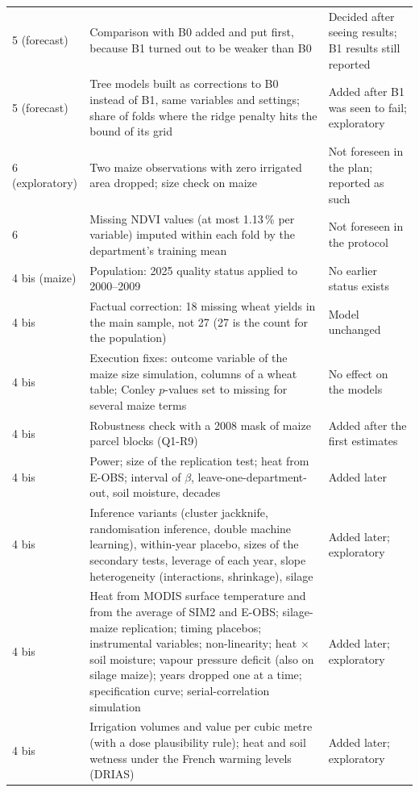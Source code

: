 {\begin{longtable}{>{\raggedright}p{1.3cm}>{\raggedright}p{7.3cm}>{\raggedright\arraybackslash}p{4.6cm}}
5 (forecast) & Comparison with B0 added and put first, because B1 turned out to be weaker than B0 & Decided after seeing results; B1 results still reported \\
5 (forecast) & Tree models built as corrections to B0 instead of B1, same variables and settings; share of folds where the ridge penalty hits the bound of its grid & Added after B1 was seen to fail; exploratory \\
6 (explor\-atory) & Two maize observations with zero irrigated area dropped; size check on maize & Not foreseen in the plan; reported as such \\
6 & Missing NDVI values (at most 1.13\,\% per variable) imputed within each fold by the department's training mean & Not foreseen in the protocol \\
4 bis (maize) & Population: 2025 quality status applied to 2000--2009 & No earlier status exists \\
4 bis & Factual correction: 18 missing wheat yields in the main sample, not 27 (27 is the count for the population) & Model unchanged \\
4 bis & Execution fixes: outcome variable of the maize size simulation, columns of a wheat table; Conley $p$-values set to missing for several maize terms & No effect on the models \\
4 bis & Robustness check with a 2008 mask of maize parcel blocks (Q1-R9) & Added after the first estimates \\
4 bis & Power; size of the replication test; heat from E-OBS; interval of $\beta$, leave-one-department-out, soil moisture, decades & Added later \\
4 bis & Inference variants (cluster jackknife, randomisation inference, double machine learning), within-year placebo, sizes of the secondary tests, leverage of each year, slope heterogeneity (interactions, shrinkage), silage & Added later; exploratory \\
4 bis & Heat from MODIS surface temperature and from the average of SIM2 and E-OBS; silage-maize replication; timing placebos; instrumental variables; non-linearity; heat $\times$ soil moisture; vapour pressure deficit (also on silage maize); years dropped one at a time; specification curve; serial-correlation simulation & Added later; exploratory \\
4 bis & Irrigation volumes and value per cubic metre (with a dose plausibility rule); heat and soil wetness under the French warming levels (DRIAS) & Added later; exploratory \\

\end{longtable}}
